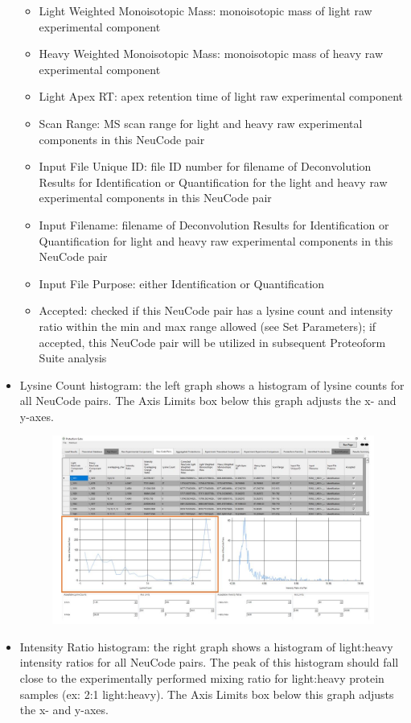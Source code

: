 \begin{itemize}
\begin{itemize}
		\item Light Weighted Monoisotopic Mass: monoisotopic mass of light raw experimental component
		\item Heavy Weighted Monoisotopic Mass: monoisotopic mass of heavy raw experimental component
		\item Light Apex RT: apex retention time of light raw experimental component
		\item Scan Range: MS scan range for light and heavy raw experimental components in this NeuCode pair
		\item Input File Unique ID: file ID number for filename of Deconvolution Results for Identification or Quantification for the light and heavy raw experimental components in this NeuCode pair
		\item Input Filename: filename of Deconvolution Results for Identification or Quantification for light and heavy raw experimental components in this NeuCode pair
		\item Input File Purpose: either Identification or Quantification
		\item Accepted: checked if this NeuCode pair has a lysine count and intensity ratio within the min and max range allowed (see Set Parameters); if accepted, this NeuCode pair will be utilized in subsequent Proteoform Suite analysis
\end{itemize}
\item Lysine Count histogram: the left graph shows a histogram of lysine counts for all NeuCode pairs. The Axis Limits box below this graph adjusts the x- and y-axes.
	\begin{figure}[h]
\centering
\includegraphics[scale=0.5]{figures/neucode3.jpg}
\end{figure}
\pagebreak
\item Intensity Ratio histogram: the right graph shows a histogram of light:heavy intensity ratios for all NeuCode pairs. The peak of this histogram should fall close to the experimentally performed mixing ratio for light:heavy protein samples (ex: 2:1 light:heavy). The Axis Limits box below this graph adjusts the x- and y-axes.

\end{itemize}
